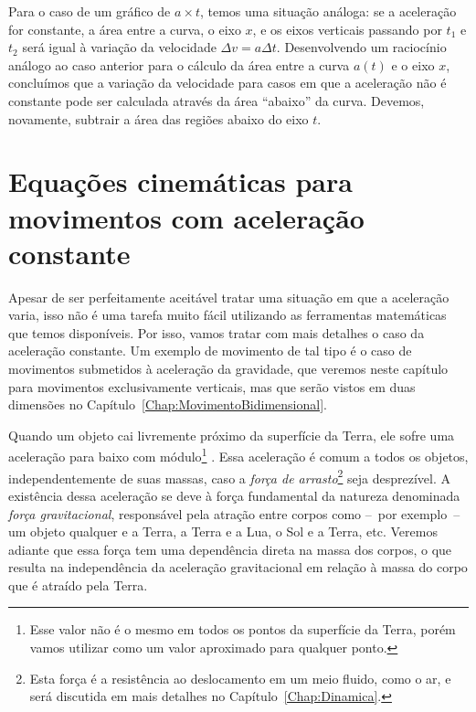 Para o caso de um gráfico de $a \times t$, temos uma situação análoga: se a aceleração for constante, a área entre a curva, o eixo $x$, e os eixos verticais passando por $t_1$ e $t_2$ será igual à variação da velocidade $\Delta v = a \Delta t$. Desenvolvendo um raciocínio análogo ao caso anterior para o cálculo da área entre a curva $a(t)$ e o eixo $x$, concluímos que a variação da velocidade para casos em que a aceleração não é constante pode ser calculada através da área ``abaixo'' da curva. Devemos, novamente, subtrair a área das regiões abaixo do eixo $t$.

\section{Equações cinemáticas para movimentos com aceleração constante}

Apesar de ser perfeitamente aceitável tratar uma situação em que a aceleração varia, isso não é uma tarefa muito fácil utilizando as ferramentas matemáticas que temos disponíveis. Por isso, vamos tratar com mais detalhes o caso da aceleração constante. Um exemplo de movimento de tal tipo é o caso de movimentos submetidos à aceleração da gravidade, que veremos neste capítulo para movimentos exclusivamente verticais, mas que serão vistos em duas dimensões no Capítulo~\ref{Chap:MovimentoBidimensional}. 

Quando um objeto cai livremente próximo da superfície da Terra, ele sofre uma aceleração para baixo com módulo\footnote{Esse valor não é o mesmo em todos os pontos da superfície da Terra, porém vamos utilizar  como um valor aproximado para qualquer ponto.} . Essa aceleração é comum a todos os objetos, independentemente de suas massas, caso a \emph{força de arrasto}\footnote{Esta força é a resistência ao deslocamento em um meio fluido, como o ar, e será discutida em mais detalhes no Capítulo~\ref{Chap:Dinamica}.} seja desprezível. A existência dessa aceleração se deve à força fundamental da natureza denominada \emph{força gravitacional}, responsável pela atração entre corpos como --~por exemplo~-- um objeto qualquer e a Terra, a Terra e a Lua, o Sol e a Terra, etc. Veremos adiante que essa força tem uma dependência direta na massa dos corpos, o que resulta na independência da aceleração gravitacional em relação à massa do corpo que é atraído pela Terra.

